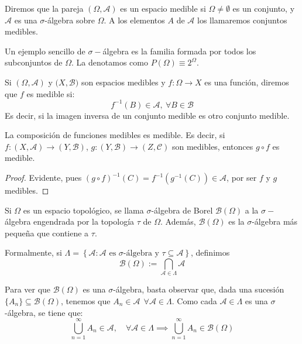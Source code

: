 \begin{ndef} Diremos que la pareja $(\Omega, \mathscr A)$ es un espacio medible si $\Omega \ne \emptyset$ es un conjunto, y $\mathscr A$ es una $\sigma$-álgebra sobre $\Omega$. A los elementos $A$ de $\mathscr A$ los llamaremos conjuntos medibles.
\end{ndef}

\begin{nota}
  Un ejemplo sencillo de $\sigma-$álgebra es la familia formada por todos los subconjuntos de $\Omega$. La denotamos como $P(\Omega) \equiv 2^\Omega$.
\end{nota}

\begin{ndef}
  Si $(\Omega,\mathscr A) $ y $(X,\mathcal{B)}$ son espacios medibles y \mbox{$f: \Omega \to X$} es una función, diremos que $f$ es medible si:
  \[
    f^{-1}(B) \in \mathscr A, \ \forall B \in \mathcal{B}
  \]
  Es decir, si la imagen inversa de un conjunto medible es otro conjunto medible.
\end{ndef}

\begin{nprop} La composición de funciones medibles es medible. Es decir, si\\ \mbox{$f:(X,\mathscr A) \longrightarrow (Y,\mathcal B)$}, $g:(Y,\mathcal B) \longrightarrow (Z,\mathcal C)$ son medibles, entonces $g\circ f$ es medible.
\end{nprop}

	\begin{proof}
	Evidente, pues $(g\circ f)^{-1}(C) = f^{-1}(g^{-1}(C)) \in \mathscr A$, por ser $f$ y $g$ medibles.
\end{proof}

\begin{ndef} Si $\Omega$ es un espacio topológico, se llama $\sigma$-álgebra de Borel $\mathcal B(\Omega)$ a la $\sigma-$álgebra engendrada por la topología $\tau$ de $\Omega$. Además, $\mathcal B(\Omega)$ es la $\sigma$-álgebra más pequeña que contiene a $\tau$.

Formalmente, si $\Lambda = \left\{ \mathscr A : \mathscr A \text{ es } \sigma \text{-álgebra y } \tau \subseteq \mathscr A \right\}$, definimos $$\mathcal B(\Omega) := \bigcap_{\mathscr A \in \Lambda} \mathscr A$$
\end{ndef}

Para ver que $\mathcal B(\Omega)$ es una $\sigma$-álgebra, basta observar que, dada una sucesión \mbox{$\{A_n\} \subseteq \mathcal B(\Omega)$}, tenemos que $A_n \in \mathscr A \ \ \forall \mathscr A \in \Lambda$. Como cada $\mathscr A \in \Lambda$ es una $\sigma$-álgebra, se tiene que: $$\bigcup_{n=1}^\infty A_n \in \mathscr A, \quad \forall \mathscr A \in \Lambda \implies \bigcup_{n=1}^\infty A_n \in \mathcal B(\Omega)$$

